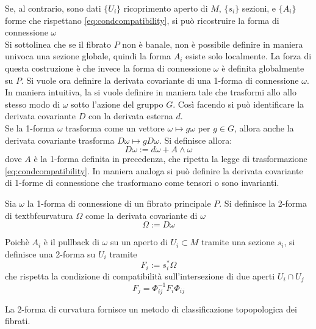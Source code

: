 Se, al contrario, sono dati $\{U_i\}$ ricoprimento aperto di $M$, $\{s_i\}$
sezioni, e $\{A_i\}$ forme che rispettano \ref{eq:condcompatibility}, si può
ricostruire la forma di connessione $\omega$\\
Si sottolinea che se il fibrato $P$ non è banale, non è possibile definire in
maniera univoca una sezione globale, quindi la forma $A_i$ esiste solo localmente.
La forza di questa costruzione è che invece la forma di connessione $\omega$
è definita globalmente su $P$.
Si vuole ora definire la derivata covariante di una
1-forma di connessione $\omega$.
In maniera intuitiva, la si vuole definire in maniera tale che trasformi allo
allo stesso modo di $\omega$ sotto l'azione del gruppo $G$. Così facendo si
può identificare la derivata covariante $D$ con la derivata esterna $d$.\\
Se la 1-forma $\omega$ trasforma come un vettore $\omega \mapsto g\omega$ per
$g \in G$, allora anche la derivata covariante trasforma $ D\omega \mapsto
g D\omega $. Si definisce allora:
   $$ D\omega := d\omega + A \wedge \omega $$
dove $A$ è la 1-forma definita in precedenza, che ripetta la legge di
trasformazione \ref{eq:condcompatibility}. In maniera analoga si può definire la
derivata covariante di 1-forme di connessione che trasformano come tensori o sono
invarianti.
\begin{definition}
   Sia $\omega$ la 1-forma di connessione di un fibrato principale $P$. Si definisce
   la 2-forma di textbf{curvatura} $\Omega$ come la derivata covariante di $\omega$
   $$ \Omega := D\omega $$
\end{definition}
Poichè $A_i$ è il pullback di $\omega$ su un aperto di $U_i \subset M$
tramite una sezione $s_i$, si definisce una 2-forma su $U_i$ tramite
\begin{equation} F_i := s_i^* \Omega \end{equation}
che rispetta la condizione di compatibilità sull'intersezione di due aperti
$U_i \cap U_j$
\begin{equation} F_j = \Phi_{ij}^{-1}F_i\Phi_{ij} \end{equation}

La 2-forma di curvatura fornisce un metodo di classificazione topopologica
dei fibrati.
